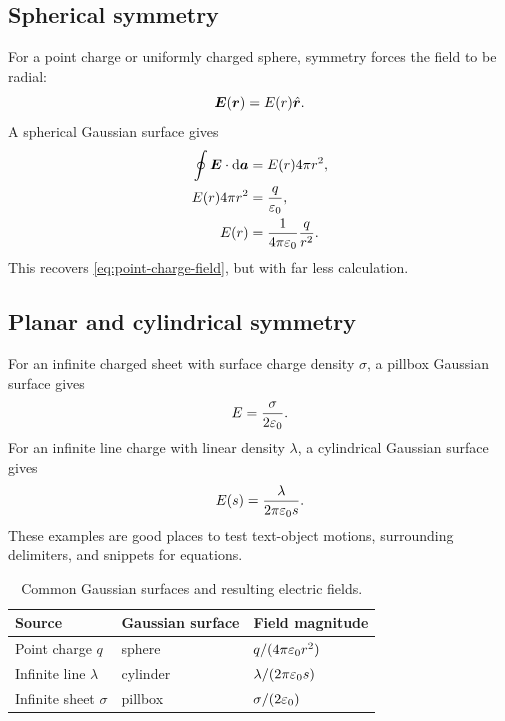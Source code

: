 \subsection{Spherical symmetry}

For a point charge or uniformly charged sphere, symmetry forces the field to be radial:
\begin{equation}
  \bm{E}(\bm{r}) = E(r)\hat{\bm{r}}.
\end{equation}
A spherical Gaussian surface gives
\begin{align}
  \oint \bm{E}\cdot \mathop{}\!\mathrm{d}\bm{a}
  &= E(r)4\pi r^2, \\
  E(r)4\pi r^2
  &= \frac{q}{\varepsilon_0}, \\
  E(r)
  &= \frac{1}{4\pi\varepsilon_0}\frac{q}{r^2}.
\end{align}
This recovers \cref{eq:point-charge-field}, but with far less calculation.

\subsection{Planar and cylindrical symmetry}

For an infinite charged sheet with surface charge density \(\sigma\), a pillbox Gaussian surface gives
\begin{equation}
  E = \frac{\sigma}{2\varepsilon_0}.
  \label{eq:sheet-field}
\end{equation}
For an infinite line charge with linear density \(\lambda\), a cylindrical Gaussian surface gives
\begin{equation}
  E(s) = \frac{\lambda}{2\pi\varepsilon_0 s}.
  \label{eq:line-field}
\end{equation}
These examples are good places to test text-object motions, surrounding delimiters, and snippets for equations.

\begin{table}[h]
\centering
\caption{Common Gaussian surfaces and resulting electric fields.}
\label{tab:gaussian-fields}
\begin{tabular}{lll}
\toprule
Source & Gaussian surface & Field magnitude \\
\midrule
Point charge \(q\) & sphere & \(q/(4\pi\varepsilon_0 r^2)\) \\
Infinite line \(\lambda\) & cylinder & \(\lambda/(2\pi\varepsilon_0 s)\) \\
Infinite sheet \(\sigma\) & pillbox & \(\sigma/(2\varepsilon_0)\) \\
\bottomrule
\end{tabular}
\end{table}

